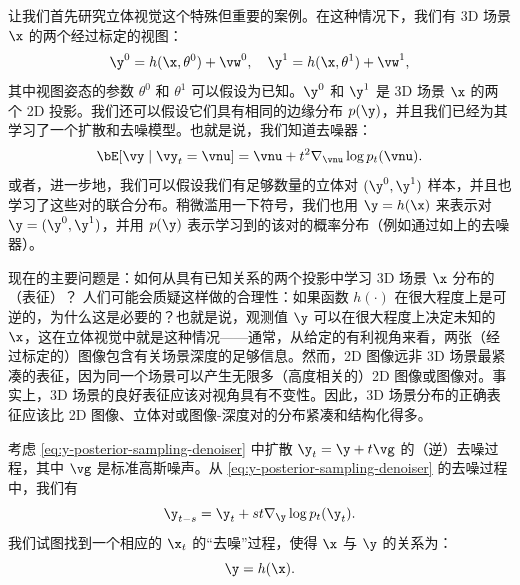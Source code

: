 \documentclass[../../book-main_zh.tex]{subfiles}
\begin{document}
让我们首先研究立体视觉这个特殊但重要的案例。在这种情况下，我们有 3D 场景 $\x$ 的两个经过标定的视图：
\begin{equation}
    \y^0 = h(\x, \theta^0) +\vw^0, \quad \y^1 = h(\x, \theta^1) +\vw^1,
\end{equation}
其中视图姿态的参数 $\theta^0$ 和 $\theta^1$ 可以假设为已知。$\y^0$ 和 $\y^1$ 是 3D 场景 $\x$ 的两个 2D 投影。我们还可以假设它们具有相同的边缘分布 $p(\y)$，并且我们已经为其学习了一个扩散和去噪模型。也就是说，我们知道去噪器：
\begin{equation}
    \bE[\vy \mid \vy_t=\vnu] =
    \vnu + t^2 \nabla_{\vnu}\log p_t(\vnu).
    \label{eq:y-posterior-sampling-denoiser}
\end{equation}
或者，进一步地，我们可以假设我们有足够数量的立体对 $(\y^0, \y^1)$ 样本，并且也学习了这些对的联合分布。稍微滥用一下符号，我们也用 $\y = h(\x)$ 来表示对 $\y = (\y^0, \y^1)$，并用 $p(\y)$ 表示学习到的该对的概率分布（例如通过如上的去噪器）。

现在的主要问题是：如何从具有已知关系的两个投影中学习 3D 场景 $\x$ 分布的（表征）？
人们可能会质疑这样做的合理性：如果函数 $h(\cdot)$ 在很大程度上是可逆的，为什么这是必要的？也就是说，观测值 $\y$ 可以在很大程度上决定未知的 $\x$，这在立体视觉中就是这种情况——通常，从给定的有利视角来看，两张（经过标定的）图像包含有关场景深度的足够信息。然而，2D 图像远非 3D 场景最紧凑的表征，因为同一个场景可以产生无限多（高度相关的）2D 图像或图像对。事实上，3D 场景的良好表征应该对视角具有不变性。因此，3D 场景分布的正确表征应该比 2D 图像、立体对或图像-深度对的分布紧凑和结构化得多。

考虑 \eqref{eq:y-posterior-sampling-denoiser} 中扩散 $\y_t =
\y + t\vg $ 的（逆）去噪过程，其中 $\vg$ 是标准高斯噪声。从 \eqref{eq:y-posterior-sampling-denoiser} 的去噪过程中，我们有
\begin{equation}
    \y_{t-s} =  \y_t + st \nabla_{\y} \log p_t(\y_t).
\end{equation}
我们试图找到一个相应的 $\x_t$ 的“去噪”过程，使得 $\x$ 与 $\y$ 的关系为：
\begin{equation}
    \y =  h(\x).
\end{equation}
\end{document}
